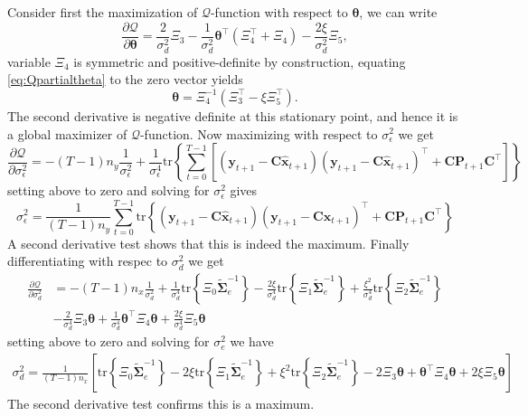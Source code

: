 \documentclass[]{article}
\begin{document}
Consider first the maximization of $\mathcal{Q}$-function with respect to $\boldsymbol\theta$, we can write
\begin{equation}\label{eq:Qpartialtheta}
 \frac{\partial \mathcal Q}{\partial \boldsymbol\theta}=\frac{2}{\sigma_d^2}\Xi_3-\frac{1}{\sigma_d^2}\boldsymbol\theta^\top(\Xi_4^\top+\Xi_4)-\frac{2\xi}{\sigma_d^2}\Xi_5,
\end{equation}
variable $\Xi_4$ is symmetric and positive-definite by construction, equating \ref{eq:Qpartialtheta} to the zero vector yields
\begin{equation}\label{eq:theta}
 \boldsymbol \theta=\Xi_4^{-1}\left(\Xi_3^\top-\xi\Xi_5^\top \right).
\end{equation}
The second derivative is negative definite at this stationary point, and hence it is a global maximizer of $\mathcal{Q}$-function.
Now maximizing with respect to $\sigma_{\epsilon}^2$ we get
\begin{equation}
  \frac{\partial \mathcal Q}{\partial \sigma_{\epsilon}^2}=-(T-1)n_y\frac{1}{\sigma_{\epsilon}^2}+\frac{1}{\sigma_{\epsilon}^4}\mathrm{tr}\left\lbrace\sum_{t=0}^{T-1}\left[ (\mathbf y_{t+1}-\mathbf C\mathbf{\hat{x}}_{t+1}) (\mathbf y_{t+1}-\mathbf C\mathbf{\hat{x}}_{t+1})^\top+\mathbf C \mathbf P_{t+1}\mathbf C^\top\right] \right\rbrace
\end{equation}
setting above to zero and solving for $\sigma_{\epsilon}^2$ gives
\begin{equation}
 \sigma_{\epsilon}^2=\frac{1}{(T-1)n_y}\sum_{t=0}^{T-1}\mathrm{tr}\left\lbrace (\mathbf y_{t+1}-\mathbf C\mathbf{\hat{x}}_{t+1}) (\mathbf y_{t+1}-\mathbf C\mathbf{\hat{x}}_{t+1})^\top+\mathbf C \mathbf P_{t+1}\mathbf C^\top \right\rbrace
\end{equation}
A second derivative test shows that this is indeed the maximum. Finally differentiating with respec to $\sigma_d^2$ we get
\begin{align}
 \frac{\partial \mathcal Q}{\partial \sigma_d^2}&= -(T-1)n_x\frac{1}{\sigma_d^2}+\frac{1}{\sigma_d^4}\mathrm{tr}\left\lbrace \Xi_0 \tilde{\boldsymbol\Sigma}_e^{-1}\right\rbrace-\frac{2\xi}{\sigma_d^4} \mathrm{tr}\left\lbrace \Xi_1 \tilde{\boldsymbol\Sigma}_e^{-1}\right\rbrace+\frac{\xi^2}{\sigma_d^4}\mathrm{tr} \left\lbrace\Xi_2\tilde{\boldsymbol\Sigma}_e^{-1} \right\rbrace  \nonumber \\
&-\frac{2}{\sigma_d^4}\Xi_3\boldsymbol\theta +\frac{1}{\sigma_d^4}\boldsymbol\theta^\top \Xi_4\boldsymbol\theta+\frac{2\xi}{\sigma_d^4} \Xi_5 \boldsymbol\theta 
\end{align}
setting above to zero and solving for $\sigma_e^2$ we have
\begin{align}
\sigma_d^2=\frac{1}{(T-1)n_x}\left[ \mathrm{tr}\left\lbrace \Xi_0 \tilde{\boldsymbol\Sigma}_e^{-1}\right\rbrace-
2\xi\mathrm{tr}\left\lbrace \Xi_1 \tilde{\boldsymbol\Sigma}_e^{-1}\right\rbrace +\xi^2\mathrm{tr} \left\lbrace\Xi_2\tilde{\boldsymbol\Sigma}_e^{-1}\right\rbrace -2\Xi_3\boldsymbol\theta+\boldsymbol\theta^\top \Xi_4\boldsymbol\theta+2\xi\Xi_5 \boldsymbol\theta\right]  
\end{align}
The second derivative test confirms this is a maximum. 
\end{document}
